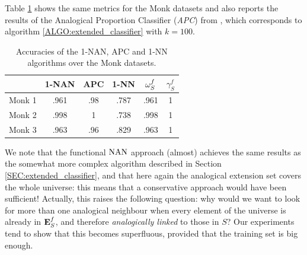 Table \ref{TAB:monks} shows the same metrics for the Monk datasets and also
reports the results of the Analogical Proportion Classifier (\textit{APC}) from
\cite{MicBayDelJAIR08}, which corresponds to algorithm
\ref{ALGO:extended_classifier} with $k=100$.
\begin{table}
\centering
\begin{tabular}{ l  c  c c  c  c }
\toprule
& 1-NAN  & APC & 1-NN  &  $\omega_{S}^{f}$ & $\gamma_S^f$ \\
\midrule
Monk 1 & .961 & .98 & .787 &   .961    &   1 \\
Monk 2 & .998 & 1 & .738 &    .998    &   1 \\
Monk 3 & .963 & .96 & .829 &   .963    &   1 \\
\bottomrule
\end{tabular}
\caption{Accuracies of the 1-NAN, APC and 1-NN algorithms over the Monk
  datasets.}
  \label{TAB:monks}
\end{table}
We note that the functional $\mbox{NAN}$ approach (almost) achieves the same results
as the somewhat more complex algorithm described in Section
\ref{SEC:extended_classifier}, and that here again the analogical extension set
covers the whole universe: this means that a conservative approach would have
been sufficient! Actually, this raises the following question: why would we
want to look for more than one analogical neighbour when every element of the
universe is already in $\mathbf{E}_{S}^{f}$, and therefore \textit{analogically linked} to
those in $S$? Our experiments tend to show that this becomes superfluous,
provided that the training set is big enough.

